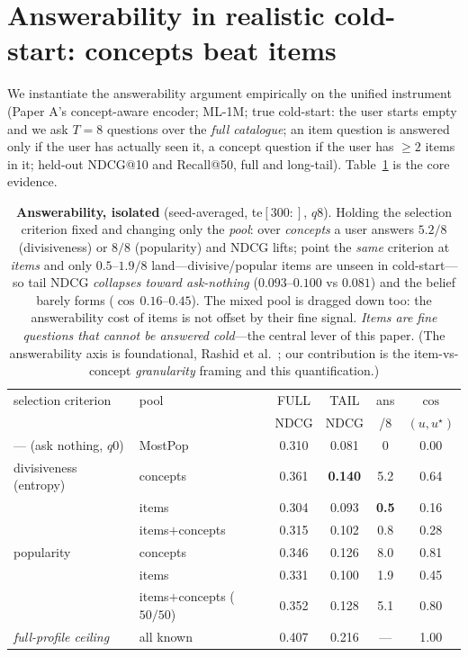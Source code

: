 \documentclass[11pt]{article}
\begin{document}
\section{Answerability in realistic cold-start: concepts beat items}\label{sec:answerresults}
We instantiate the answerability argument empirically on the unified instrument (Paper A's concept-aware encoder; ML-1M;
true cold-start: the user starts empty and we ask $T{=}8$ questions over the \emph{full catalogue}; an item question is
answered only if the user has actually seen it, a concept question if the user has $\ge 2$ items in it; held-out NDCG@10
and Recall@50, full and long-tail). Table~\ref{tab:answer_cold} is the core evidence.
\begin{table}[h]\centering\small
\begin{tabular}{l l cc c c}
\toprule
selection criterion & pool & FULL & TAIL & ans & $\cos$\\
 & & NDCG & NDCG & /8 & $(u,u^\star)$\\
\midrule
--- (ask nothing, $q0$) & MostPop & 0.310 & 0.081 & 0 & 0.00\\
\midrule
divisiveness (entropy) & concepts & 0.361 & \textbf{0.140} & 5.2 & 0.64\\
 & items & 0.304 & 0.093 & \textbf{0.5} & 0.16\\
 & items$+$concepts & 0.315 & 0.102 & 0.8 & 0.28\\
\midrule
popularity & concepts & 0.346 & 0.126 & 8.0 & 0.81\\
 & items & 0.331 & 0.100 & 1.9 & 0.45\\
 & items$+$concepts ($50/50$) & 0.352 & 0.128 & 5.1 & 0.80\\
\midrule
\emph{full-profile ceiling} & all known & 0.407 & 0.216 & --- & 1.00\\
\bottomrule
\end{tabular}
\caption{\textbf{Answerability, isolated} (seed-averaged, te$[300{:}]$, $q8$). Holding the selection criterion fixed and
changing only the \emph{pool}: over \emph{concepts} a user answers $5.2/8$ (divisiveness) or $8/8$ (popularity) and NDCG
lifts; point the \emph{same} criterion at \emph{items} and only $0.5$--$1.9/8$ land---divisive/popular items are unseen
in cold-start---so tail NDCG \emph{collapses toward ask-nothing} ($0.093$--$0.100$ vs $0.081$) and the belief barely
forms ($\cos\,0.16$--$0.45$). The mixed pool is dragged down too: the answerability cost of items is not offset by their
fine signal. \emph{Items are fine questions that cannot be answered cold}---the central lever of this paper. (The
answerability axis is foundational, Rashid et al.\ \cite{rashid}; our contribution is the item-vs-concept
\emph{granularity} framing and this quantification.)}
\label{tab:answer_cold}
\end{table}
\end{document}
